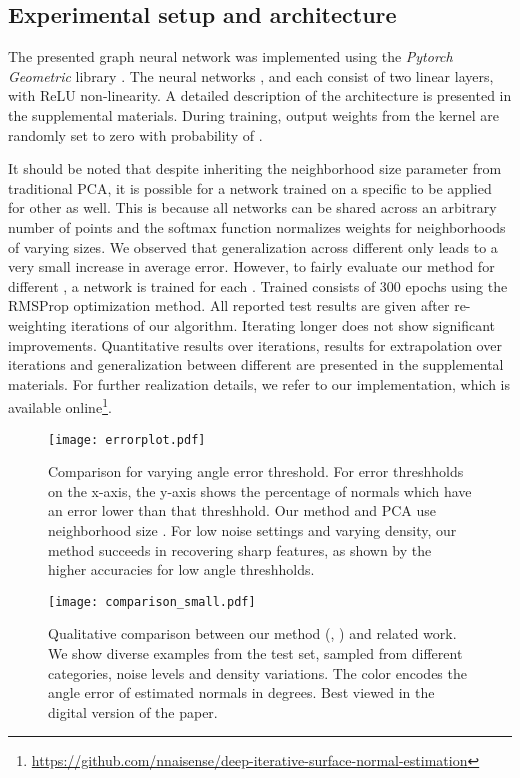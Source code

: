 \documentclass[10pt,twocolumn,letterpaper]{article}
\begin{document}
\subsection{Experimental setup and architecture}
\label{sec:expsetup}
The presented graph neural network was implemented using the 
\emph{Pytorch Geometric} library \cite{Fey:2019}. The neural networks 
,  and  each consist of two linear layers, with ReLU
non-linearity. A detailed description of the architecture is
presented in the supplemental materials. During training, output weights from the kernel are randomly set to zero with probability of . 

It should be noted that despite inheriting the neighborhood size parameter from traditional PCA, it is possible for a network trained on a
specific  to be applied for other  as well. 
This is because all networks can be shared across an arbitrary number of 
points and the softmax function normalizes weights for neighborhoods of
varying sizes. We observed that generalization
across different  only leads to a very small increase in average
error. 
However, to fairly evaluate our method for different , a network is trained for each .
Trained consists of 300 epochs using the RMSProp optimization 
method. 
All reported test results are given after  re-weighting iterations of
our algorithm. Iterating longer does not show significant improvements. 
Quantitative results over iterations, results for extrapolation over iterations and generalization between different  are presented in the 
supplemental materials. For further realization details, we refer to our implementation, which is available online\footnote{\footnotesize\url{https://github.com/nnaisense/deep-iterative-surface-normal-estimation}}.


 \begin{figure}[t]
\centering
  \texttt{[image: errorplot.pdf]}
  \caption{Comparison for varying angle error threshold. For error threshholds on the x-axis, the y-axis shows the percentage of normals which have an error lower than that threshhold. Our method and PCA use neighborhood size . For low noise settings and varying density, our method succeeds in recovering sharp features, as shown by the higher accuracies for low angle threshholds.}
  \label{fig:errorplot}
\end{figure}

 \begin{figure*}[t]
\centering
  \texttt{[image: comparison\_small.pdf]}
  \caption{Qualitative comparison between our method (, ) and related work. We show diverse examples from the test set, sampled from different categories, noise levels and density variations. The color encodes the angle error of estimated normals in degrees. Best viewed in the digital version of the paper.}
  \label{fig:qual_comparison}

\end{figure*}
\end{document}
